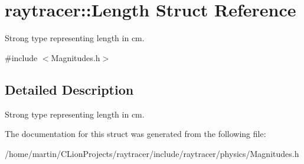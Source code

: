 \hypertarget{structraytracer_1_1Length}{}\section{raytracer\+:\+:Length Struct Reference}
\label{structraytracer_1_1Length}


Strong type representing length in cm.  




{\ttfamily \#include $<$Magnitudes.\+h$>$}



\subsection{Detailed Description}
Strong type representing length in cm. 



The documentation for this struct was generated from the following file\+:\begin{DoxyCompactItemize}
\item 
/home/martin/\+C\+Lion\+Projects/raytracer/include/raytracer/physics/Magnitudes.\+h\end{DoxyCompactItemize}

